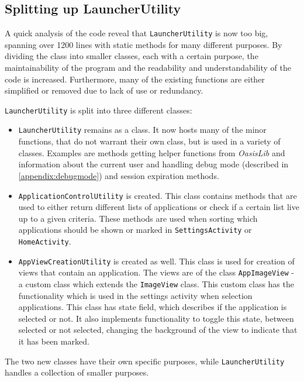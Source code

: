 \subsection{Splitting up LauncherUtility}\label{sect:sprint4:refactoring}

A quick analysis of the code reveal that \lstinline|LauncherUtility| is now too big, spanning over 1200 lines with static methods for many different purposes.
By dividing the class into smaller classes, each with a certain purpose, the maintainability of the program and the readability and understandability of the code is increased.
Furthermore, many of the existing functions are either simplified or removed due to lack of use or redundancy.

\lstinline|LauncherUtility| is split into three different classes:

\begin{itemize}
\item \lstinline|LauncherUtility| remains as a class.
It now hosts many of the minor functions, that do not warrant their own class, but is used in a variety of classes.
Examples are methods getting helper functions from \textit{OasisLib} and  information about the current user and handling debug mode (described in \cref{appendix:debugmode}) and session expiration methods.
\item \lstinline|ApplicationControlUtility| is created.
This class contains methods that are used to either return different lists of applications or check if a certain list live up to a given criteria.
These methods are used when sorting which applications should be shown or marked in \lstinline|SettingsActivity| or \lstinline|HomeActivity|.
\item \lstinline|AppViewCreationUtility| is created as well.
This class is used for creation of views that contain an application.
The views are of the class \lstinline|AppImageView| - a custom class which extends the \lstinline|ImageView| class. This custom class has the functionality which is used in the settings activity when selection applications. This class has state field, which describes if the application is selected or not. It also implements functionality to toggle this state, between selected or not selected, changing the background of the view to indicate that it has been marked.
\end{itemize}

The two new classes have their own specific purposes, while \lstinline|LauncherUtility| handles a collection of smaller purposes.